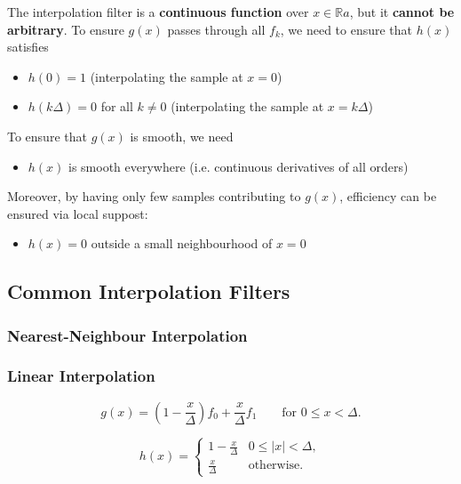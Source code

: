 The interpolation filter is a \textbf{continuous function} over $x \in \mathbb{R}a$, but it \textbf{cannot be arbitrary}. To ensure $g(x)$ passes through all $f_k$, we need to ensure that $h(x)$ satisfies \begin{itemize}
    \item $h(0) = 1$ (interpolating the sample at $x = 0$)
    \item $h(k\Delta) = 0$ for all $k \neq 0$ (interpolating the sample at $x = k\Delta$)
\end{itemize} To ensure that $g(x)$ is smooth, we need \begin{itemize}
    \item $h(x)$ is smooth everywhere (i.e. continuous derivatives of all orders)
\end{itemize} Moreover, by having only few samples contributing to $g(x)$, efficiency can be ensured via local suppost: \begin{itemize}
    \item $h(x) = 0$ outside a small neighbourhood of $x = 0$
\end{itemize}

\subsection{Common Interpolation Filters}

\subsubsection{Nearest-Neighbour Interpolation}


\subsubsection{Linear Interpolation}


\[
    g(x) = \left( 1 - \frac{x}{\Delta} \right) f_0 + \frac{x}{\Delta} f_1 \qquad \text{for } 0 \leq x < \Delta.
\]


\[
    h(x) = \begin{cases}
        1 - \frac{x}{\Delta} & 0 \leq |x| < \Delta, \\
        \frac{x}{\Delta}     & \text{otherwise}.
    \end{cases}
\]


